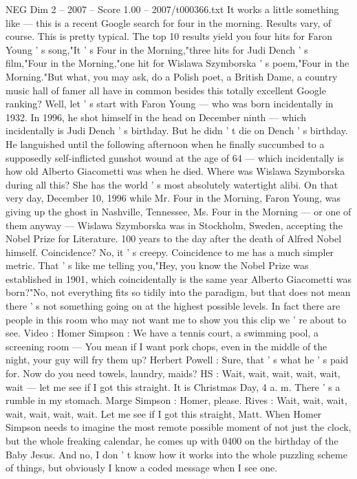 \begin{textsample}{NEG Dim 2 – 2007 – Score 1.00 – 2007/t000366.txt}
It works a little something like — this is a recent Google search for four in the morning.
Results vary, of course.
This is pretty typical.
The top 10 results yield you four hits for Faron Young ' s song,"It ' s Four in the Morning,"three hits for Judi Dench ' s film,"Four in the Morning,"one hit for Wislawa Szymborska ' s poem,"Four in the Morning."But what, you may ask, do a Polish poet, a British Dame, a country music hall of famer all have in common besides this totally excellent Google ranking?
Well, let ' s start with Faron Young — who was born incidentally in 1932.
In 1996, he shot himself in the head on December ninth — which incidentally is Judi Dench ' s birthday.
But he didn ' t die on Dench ' s birthday.
He languished until the following afternoon when he finally succumbed to a supposedly self-inflicted gunshot wound at the age of 64 — which incidentally is how old Alberto Giacometti was when he died.
Where was Wislawa Szymborska during all this?
She has the world ' s most absolutely watertight alibi.
On that very day, December 10, 1996 while Mr.
Four in the Morning, Faron Young, was giving up the ghost in Nashville, Tennessee, Ms.
Four in the Morning — or one of them anyway — Wislawa Szymborska was in Stockholm, Sweden, accepting the Nobel Prize for Literature. 100 years to the day after the death of Alfred Nobel himself.
Coincidence?
No, it ' s creepy.
Coincidence to me has a much simpler metric.
That ' s like me telling you,"Hey, you know the Nobel Prize was established in 1901, which coincidentally is the same year Alberto Giacometti was born?"No, not everything fits so tidily into the paradigm, but that does not mean there ' s not something going on at the highest possible levels.
In fact there are people in this room who may not want me to show you this clip we ' re about to see.
Video : Homer Simpson : We have a tennis court, a swimming pool, a screening room — You mean if I want pork chops, even in the middle of the night, your guy will fry them up?
Herbert Powell : Sure, that ' s what he ' s paid for.
Now do you need towels, laundry, maids?
HS : Wait, wait, wait, wait, wait, wait — let me see if I got this straight.
It is Christmas Day, 4 a. m.
There ' s a rumble in my stomach.
Marge Simpson : Homer, please.
Rives : Wait, wait, wait, wait, wait, wait, wait.
Let me see if I got this straight, Matt.
When Homer Simpson needs to imagine the most remote possible moment of not just the clock, but the whole freaking calendar, he comes up with 0400 on the birthday of the Baby Jesus.
And no, I don ' t know how it works into the whole puzzling scheme of things, but obviously I know a coded message when I see one.

\end{textsample}
